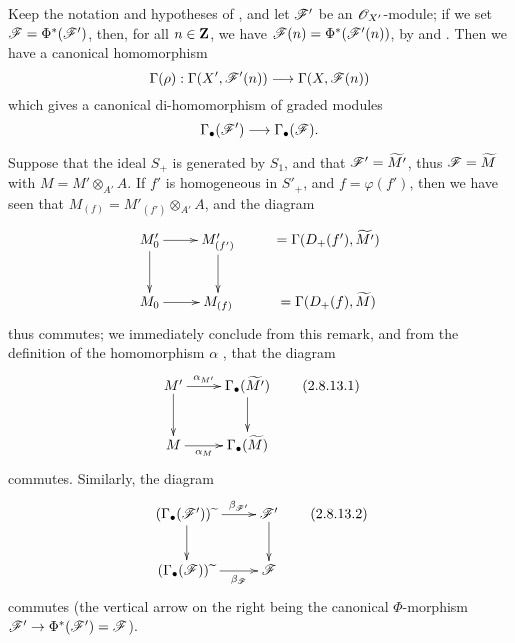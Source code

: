 \begin{env}[2.8.13]
\label{II.2.8.13}
Keep the notation and hypotheses of , and let $\mathscr{F}'$ be an $\mathscr{O}_{X'}$-module;
if we set $\mathscr{F}=\Phi^*(\mathscr{F}')$, then, for all $n\in\mathbf{Z}$, we have $\mathscr{F}(n)=\Phi^*(\mathscr{F}'(n))$, by  and .
Then  we have a canonical homomorphism
\[
  \Gamma(\rho): \Gamma(X',\sh{F}'(n)) \to \Gamma(X,\sh{F}(n))
\]
which gives a canonical di-homomorphism of graded modules
\[
  \Gamma_\bullet(\sh{F}') \to \Gamma_\bullet(\sh{F}).
\]

Suppose that the ideal $S_+$ is generated by $S_1$, and that $\mathscr{F}'=\widetilde{M'}$, thus $\mathscr{F}=\widetilde{M}$ with $M=M'\otimes_{A'}A$.
If $f'$ is homogeneous in $S'_+$, and $f=\varphi(f')$, then we have seen that $M_{(f)}=M'_{(f')}\otimes_{A'}A$, and the diagram
\[
  \xymatrix{
    M'_0 \ar[r] \ar[d]
    & M'_{(f')} \ar[d]
    & =\Gamma(D_+(f'),\widetilde{M'})
  \\M_0 \ar[r]
    & M_{(f)}
    & =\Gamma(D_+(f),\widetilde{M})
  }
\]
thus commutes;
we immediately conclude from this remark, and from the definition of the homomorphism $\alpha$ , that the diagram
\[
\label{II.2.8.13.1}
  \xymatrix{
    M' \ar[r]^-{\alpha_{M'}} \ar[d]
    & \Gamma_\bullet(\widetilde{M'}) \ar[d]
  \\M \ar[r]_-{\alpha_M}
    & \Gamma_\bullet(\widetilde{M})
  }
\tag{2.8.13.1}
\]
commutes.
Similarly, the diagram
\[
\label{II.2.8.13.2}
  \xymatrix{
    (\Gamma_\bullet(\sh{F}'))\supertilde \ar[r]^-{\beta_{\sh{F}'}} \ar[d]
    & \sh{F}' \ar[d]
  \\(\Gamma_\bullet(\sh{F}))\supertilde \ar[r]_-{\beta_{\sh{F}}}
    & \sh{F}
  }
\tag{2.8.13.2}
\]
commutes (the vertical arrow on the right being the canonical $\Phi$-morphism $\sh{F}'\to\Phi^*(\sh{F}')=\sh{F}$).
\end{env}


